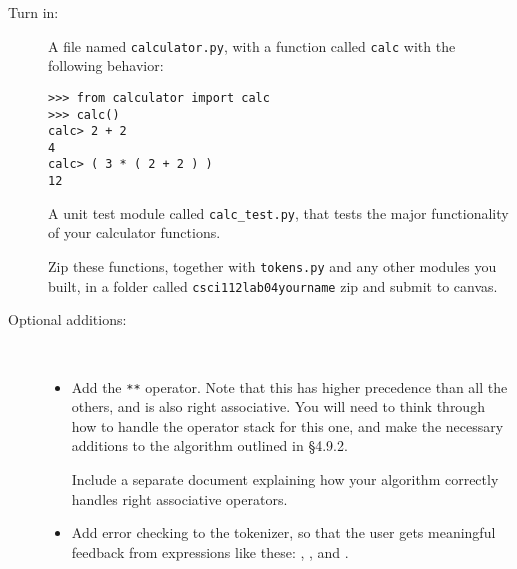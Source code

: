 \documentclass{article}
\newcommand{\bi}{\begin{itemize}}
\newcommand{\li}{\item}
\newcommand{\ei}{\end{itemize}}
\begin{document}
\begin{description}
\item[Turn in:]  A file named \lstinline{calculator.py}, with a function
called \lstinline{calc} with the following behavior:
\begin{lstlisting}
>>> from calculator import calc
>>> calc()
calc> 2 + 2
4
calc> ( 3 * ( 2 + 2 ) )
12
\end{lstlisting}

A unit test module called \lstinline{calc_test.py}, that tests the major
functionality of your calculator functions.

Zip these functions, together with \lstinline{tokens.py} and any other
modules you built, in a folder called \lstinline{csci112lab04yourname} zip and submit to canvas.

\item[Optional additions:]~ 

\bi
\li Add the \lstinline{**} operator.  Note that this has higher precedence
than all the others, and is also right associative.  You will need to think through
how to handle the operator stack for this one, and make the necessary
additions to the algorithm outlined in \S 4.9.2.

Include  a separate document explaining how your
algorithm correctly handles right associative operators.


\li Add error checking to the tokenizer, so that the user gets meaningful
feedback from expressions like these:
, 
, and
.


\ei


\end{description}
\end{document}
